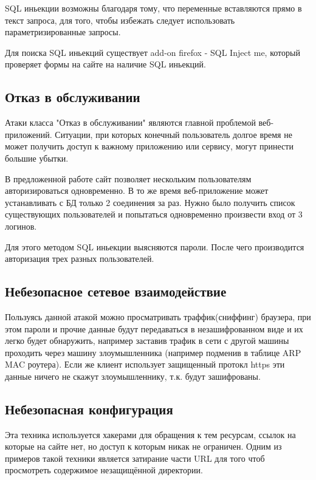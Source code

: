 \documentclass{article}
\begin{document}
SQL иньекции возможны благодаря тому, что переменные вставляются прямо в текст запроса, для того, чтобы избежать следует использовать параметризированные запросы.

Для поиска SQL иньекций существует add-on firefox - SQL Inject me, который проверяет формы на сайте на наличие SQL иньекций.



\subsection{Отказ в обслуживании}

Атаки класса "Отказ в обслуживании" являются главной проблемой веб-приложений. Ситуации, при которых конечный пользователь
долгое время не может получить доступ к важному приложению или сервису, могут принести большие убытки.

В предложенной работе сайт позволяет нескольким пользователям авторизироваться одновременно. В то же время
веб-приложение может устанавливать с БД только 2 соединения за раз. Нужно было получить
список существующих пользователей и попытаться одновременно произвести вход от 3 логинов.

Для этого методом SQL иньекции выясняются пароли. После чего производится авторизация трех разных пользователей.


\subsection{Небезопасное сетевое взаимодействие}

Пользуясь данной атакой можно просматривать траффик(сниффинг) браузера, при этом пароли и прочие данные будут передаваться в незашифрованном виде и их легко будет обнаружить, например заставив трафик в сети с другой машины проходить через машину злоумышленника (например подменив в таблице ARP MAC роутера). Если же клиент использует защищенный протокл https эти данные ничего не скажут злоумышленнику, т.к. будут зашифрованы.


\subsection{Небезопасная конфигурация}

Эта техника используется хакерами для обращения к тем ресурсам, ссылок на которые на сайте нет, но доступ к которым никак не ограничен.
Одним из примеров такой техники является затирание части URL для того чтоб просмотреть содержимое незащищённой директории.
\end{document}
